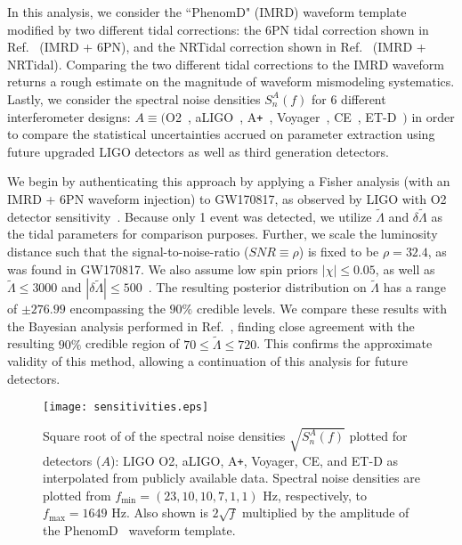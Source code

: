 \documentclass[prd,twocolumn,nofootinbib,superscriptaddress,amsmath,amssymb]{revtex4-1}
\begin{document}
In this analysis, we consider the ``PhenomD" (IMRD) waveform template~\cite{PhenomDI,PhenomDII} modified by two different tidal corrections: the 6PN tidal correction shown in Ref.~\cite{Wade:tidalCorrections} (IMRD + 6PN), and the NRTidal correction shown in Ref.~\cite{Samajdar:NRTidal} (IMRD + NRTidal).
Comparing the two different tidal corrections to the IMRD waveform returns a rough estimate on the magnitude of waveform mismodeling systematics.
Lastly, we consider the spectral noise densities $S_n^A(f)$ for 6 different interferometer designs: $A \equiv ($O2~\cite{aLIGO}, aLIGO~\cite{aLIGO}, A\texttt{+}~\cite{Ap_Voyager_CE}, Voyager~\cite{Ap_Voyager_CE}, CE~\cite{ET}, ET-D~\cite{Ap_Voyager_CE}$)$ in order to compare the statistical uncertainties accrued on parameter extraction using future upgraded LIGO detectors as well as third generation detectors.

We begin by authenticating this approach by applying a Fisher analysis (with an IMRD + 6PN waveform injection) to GW170817, as observed by LIGO with O2 detector sensitivity~\cite{aLIGO}.
Because only 1 event was detected, we utilize $\tilde\Lambda$ and $\delta\tilde\Lambda$ as the tidal parameters for comparison purposes.
Further, we scale the luminosity distance such that the signal-to-noise-ratio ($SNR \equiv \rho$) is fixed to be $\rho=32.4$, as was found in GW170817.
We also assume low spin priors $|\chi| \leq 0.05$, as well as $\tilde{\Lambda} \leq 3000$ and $|\delta \tilde{\Lambda}| \leq 500$~\cite{Wade:LambdaPriors}.
The resulting posterior distribution on $\tilde{\Lambda}$ has a range of $\pm 276.99$ encompassing the $90\%$ credible levels.
We compare these results with the Bayesian analysis performed in Ref.~\cite{TheLIGOScientific:2017qsa,Abbott2018}, finding close agreement with the resulting $90\%$ credible region of $70 \leq \tilde{\Lambda} \leq 720$.
This confirms the approximate validity of this method, allowing a continuation of this analysis for future detectors.
\begin{figure}
\begin{center} 
\texttt{[image: sensitivities.eps]}
\end{center}
\caption{
Square root of of the spectral noise densities $\sqrt{S_n^A(f)}$ plotted for detectors ($A$): LIGO O2, aLIGO, A\texttt{+}, Voyager, CE, and ET-D as interpolated from publicly available data.
Spectral noise densities are plotted from $f_{\text{min}}=(23,10,10,7,1,1) \text{ Hz}$, respectively, to $f_{\text{max}}=1649 \text{ Hz}$.
Also shown is $2 \sqrt{f}$ multiplied by the amplitude of the PhenomD~\cite{PhenomDI,PhenomDII} waveform template.
}
\label{fig:sensitivities}
\end{figure}
\end{document}

